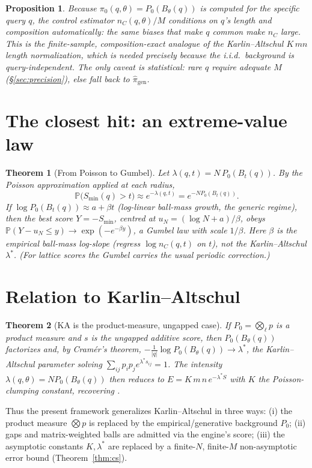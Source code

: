\documentclass[11pt]{article}
\theoremstyle{oldplain}
\newtheorem{theorem}{Theorem}
\newtheorem{proposition}{Proposition}
\theoremstyle{oldrem}
\newcommand{\Pzero}{P_{0}}
\newcommand{\ball}[2]{B_{#1}(#2)}
\newcommand{\Prob}{\mathbb{P}}
\begin{document}
\begin{proposition}\label{prop:composition}
Because $\pi_0(q,\theta)=\Pzero(\ball{\theta}{q})$ is computed for the \emph{specific} query $q$, the
control estimator $n_C(q,\theta)/M$ conditions on $q$'s length and composition automatically: the
same biases that make $q$ common make $n_C$ large. This is the finite-sample, composition-exact
analogue of the Karlin--Altschul $K\,mn$ length normalization, which is needed precisely because the
i.i.d.\ background is query-independent. The only caveat is statistical: rare $q$ require adequate
$M$ (\S\ref{sec:precision}), else fall back to $\hat\pi_{\mathrm{gen}}$.
\end{proposition}

\section{The closest hit: an extreme-value law}\label{sec:gumbel}

\begin{theorem}[From Poisson to Gumbel]\label{thm:gumbel}
Let $\lambda(q,t)=N\,\Pzero(\ball{t}{q})$. By the Poisson approximation applied at each radius,
\begin{equation}
  \Prob\!\big(S_{\min}(q) > t\big) \approx e^{-\lambda(q,t)} = e^{-N\Pzero(\ball{t}{q})}.
\end{equation}
If $\log\Pzero(\ball{t}{q}) \approx a + \beta t$ (log-linear ball-mass growth, the generic regime),
then the best score $Y=-S_{\min}$, centred at $u_N=(\log N + a)/\beta$, obeys
$\Prob(Y-u_N\le y) \to \exp(-e^{-\beta y})$, a Gumbel law with scale $1/\beta$. Here $\beta$ is the
\emph{empirical} ball-mass log-slope (regress $\log n_C(q,t)$ on $t$), not the Karlin--Altschul
$\lambda^\ast$. (For lattice scores the Gumbel carries the usual periodic correction.)
\end{theorem}

\section{Relation to Karlin--Altschul}\label{sec:ka}

\begin{theorem}[KA is the product-measure, ungapped case]\label{thm:reduction}
If $\Pzero=\bigotimes_\ell p$ is a product measure and $s$ is the ungapped additive score, then
$\Pzero(\ball{\theta}{q})$ factorizes and, by Cram\'er's theorem, $-\frac1{|q|}\log
\Pzero(\ball{\theta}{q}) \to \lambda^\ast$, the Karlin--Altschul parameter solving $\sum_{ij}p_ip_j
e^{\lambda^\ast s_{ij}}=1$. The intensity $\lambda(q,\theta)=N\Pzero(\ball{\theta}{q})$ then reduces
to $E=K\,m\,n\,e^{-\lambda^\ast S}$ with $K$ the Poisson-clumping constant, recovering
\cite{Karlin1990,Karlin1993,Altschul1997}.
\end{theorem}
Thus the present framework generalizes Karlin--Altschul in three ways: (i) the product measure
$\bigotimes p$ is replaced by the empirical/generative background $\Pzero$; (ii) gaps and
matrix-weighted balls are admitted via the engine's score; (iii) the asymptotic constants
$K,\lambda^\ast$ are replaced by a finite-$N$, finite-$M$ non-asymptotic error bound
(Theorem~\ref{thm:cs}).
\end{document}

